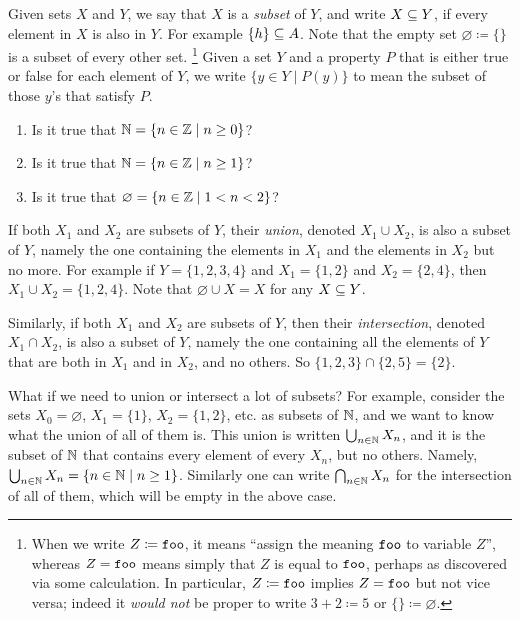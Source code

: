\documentclass[7Sketches]{subfiles}
\begin{document}
Given sets $X$ and $Y$, we say that $X$ is a \emph{subset} of $Y$, and write
$X\ss Y$, if every element in $X$ is also in $Y$. For example $\{h\}\ss A$. Note
that the empty set $\varnothing\coloneqq\{\}$ is a subset of every other set.%
	\footnote{When we write $Z\coloneqq \foo$, it means ``assign the meaning
	$\foo$ to variable $Z$'', whereas $Z=\foo$ means simply that $Z$ is
	equal to $\foo$, perhaps as discovered via some calculation. In
	particular, $Z\coloneqq \foo$ implies $Z=\foo$ but not vice versa;
	indeed it \emph{would not} be proper to write $3+2\coloneqq 5$ or
	$\{\}\coloneqq \varnothing$.
}
 Given a set $Y$ and a property $P$ that is either true or false for each element of $Y$, we write $\{y\in Y\mid P(y)\}$ to mean the subset of those $y$'s that satisfy $P$.%
%
%

\begin{exercise}%
\label{exc.comprehension_comprehension}
\begin{enumerate}
	\item Is it true that $\nn=\{n\in\zz\mid n\geq 0\}$?
	\item Is it true that $\nn=\{n\in\zz\mid n\geq 1\}$?
	\item Is it true that $\varnothing=\{n\in\zz\mid 1<n<2\}$?
\qedhere
\end{enumerate}
\end{exercise}

If both $X_1$ and $X_2$ are subsets of $Y$, their \emph{union}, denoted $X_1\cup X_2$, is also a subset of $Y$, namely the one containing the elements in $X_1$ and the elements in $X_2$ but no more. For example if $Y=\{1,2,3,4\}$ and $X_1=\{1,2\}$ and $X_2=\{2,4\}$, then $X_1\cup X_2=\{1,2,4\}$. Note that $\varnothing\cup X=X$ for any $X\ss Y$.%

Similarly, if both $X_1$ and $X_2$ are subsets of $Y$, then their \emph{intersection}, denoted $X_1\cap X_2$, is also a subset of $Y$, namely the one containing all the elements of $Y$ that are both in $X_1$ and in $X_2$, and no others. So $\{1,2,3\}\cap\{2,5\}=\{2\}$.%

What if we need to union or intersect a lot of subsets? For example, consider the sets $X_0=\varnothing$, $X_1=\{1\}$, $X_2=\{1,2\}$, etc. as subsets of $\nn$, and we want to know what the union of all of them is. This union is written $\bigcup_{n\in\nn}X_n$, and it is the subset of $\nn$ that contains every element of every $X_n$, but no others. Namely, $\bigcup_{n\in\nn}X_n=\{n\in \nn\mid n\geq 1\}$. Similarly one can write $\bigcap_{n\in\nn}X_n$ for the intersection of all of them, which will be empty in the above case.
\end{document}
